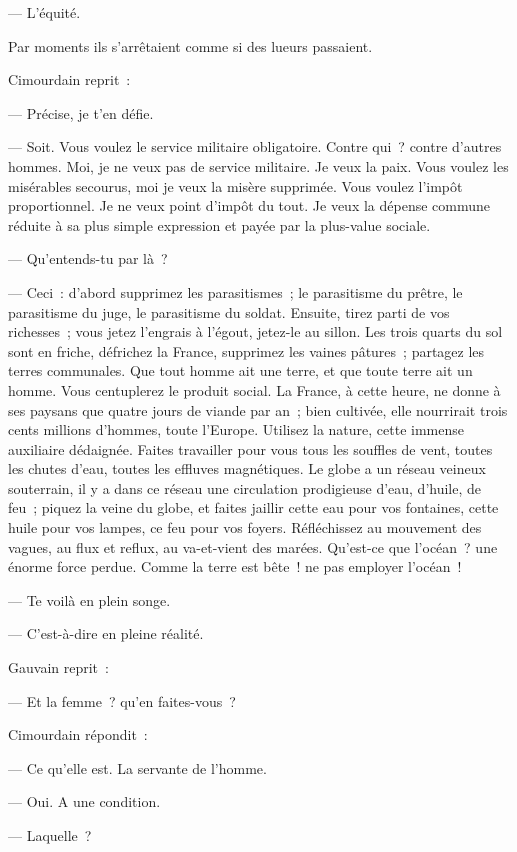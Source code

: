 \documentclass[french,twoside]{book} %
\begin{document}
— L’équité.\par
Par moments ils s’arrêtaient comme si des lueurs passaient.\par
Cimourdain reprit :\par
— Précise, je t’en défie.\par
— Soit. Vous voulez le service militaire obligatoire. Contre qui ? contre d’autres hommes. Moi, je ne veux pas de service militaire. Je veux la paix. Vous voulez les misérables secourus, moi je veux la  misère supprimée. Vous voulez l’impôt proportionnel. Je ne veux point d’impôt du tout. Je veux la dépense commune réduite à sa plus simple expression et payée par la plus-value sociale.\par
— Qu’entends-tu par là ?\par
— Ceci : d’abord supprimez les parasitismes ; le parasitisme du prêtre, le parasitisme du juge, le parasitisme du soldat. Ensuite, tirez parti de vos richesses ; vous jetez l’engrais à l’égout, jetez-le au sillon. Les trois quarts du sol sont en friche, défrichez la France, supprimez les vaines pâtures ; partagez les terres communales. Que tout homme ait une terre, et que toute terre ait un homme. Vous centuplerez le produit social. La France, à cette heure, ne donne à ses paysans que quatre jours de viande par an ; bien cultivée, elle nourrirait trois cents millions d’hommes, toute l’Europe. Utilisez la nature, cette immense auxiliaire dédaignée. Faites travailler pour vous tous les souffles de vent, toutes les chutes d’eau, toutes les effluves magnétiques. Le globe a un réseau veineux souterrain, il y a dans ce réseau une circulation prodigieuse d’eau, d’huile, de feu ; piquez la veine du globe, et faites jaillir cette eau pour vos fontaines, cette huile pour vos lampes, ce feu pour vos foyers. Réfléchissez au mouvement des vagues, au flux et reflux, au va-et-vient des marées. Qu’est-ce que l’océan ? une énorme force perdue. Comme la terre est bête ! ne pas employer l’océan !\par
— Te voilà en plein songe.\par
 — C’est-à-dire en pleine réalité.\par
Gauvain reprit :\par
— Et la femme ? qu’en faites-vous ?\par
Cimourdain répondit :\par
— Ce qu’elle est. La servante de l’homme.\par
— Oui. A une condition.\par
— Laquelle ?\par
\end{document}
